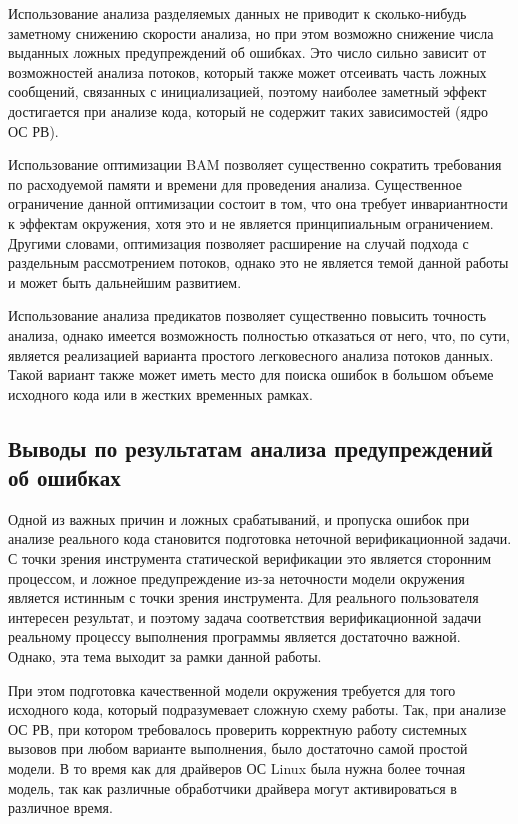 Использование анализа разделяемых данных не приводит к сколько-нибудь заметному снижению скорости анализа, но при этом возможно снижение числа выданных ложных предупреждений об ошибках. 
Это число сильно зависит от возможностей анализа потоков, который также может отсеивать часть ложных сообщений, связанных с инициализацией, поэтому наиболее заметный эффект достигается при анализе кода, который не содержит таких зависимостей (ядро ОС РВ).

Использование оптимизации BAM позволяет существенно сократить требования по расходуемой памяти и времени для проведения анализа.
Существенное ограничение данной оптимизации состоит в том, что она требует инвариантности к эффектам окружения, хотя это и не является принципиальным ограничением.
Другими словами, оптимизация позволяет расширение на случай подхода с раздельным рассмотрением потоков, однако это не является темой данной работы и может быть дальнейшим развитием.

Использование анализа предикатов позволяет существенно повысить точность анализа, однако имеется возможность полностью отказаться от него, что, по сути, является реализацией варианта простого легковесного анализа потоков данных. 
Такой вариант также может иметь место для поиска ошибок в большом объеме исходного кода или в жестких временных рамках.

\subsection{Выводы по результатам анализа предупреждений об ошибках}

Одной из важных причин и ложных срабатываний, и пропуска ошибок при анализе реального кода становится подготовка неточной верификационной задачи.
С точки зрения инструмента статической верификации это является сторонним процессом, и ложное предупреждение из-за неточности модели окружения является истинным с точки зрения инструмента.
Для реального пользователя интересен результат, и поэтому задача соответствия верификационной задачи реальному процессу выполнения программы является достаточно важной.
Однако, эта тема выходит за рамки данной работы.

При этом подготовка качественной модели окружения требуется для того исходного кода, который подразумевает сложную схему работы.
Так, при анализе ОС РВ, при котором требовалось проверить корректную работу системных вызовов при любом варианте выполнения, было достаточно самой простой модели. 
В то время как для драйверов ОС Linux была нужна более точная модель, так как различные обработчики драйвера могут активироваться в различное время.

